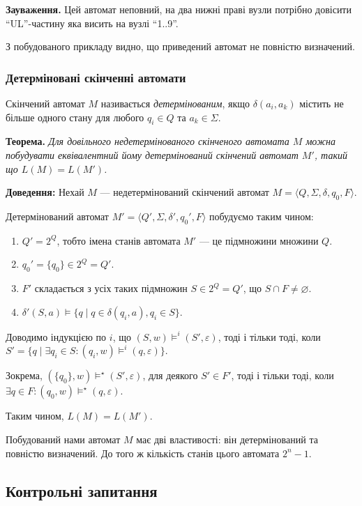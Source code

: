 \textbf{Зауваження.} Цей автомат неповний, на два нижні праві вузли потрібно довісити ``UL''-частину яка висить на вузлі ``1..9''. \medskip

З побудованого прикладу видно, що приведений автомат не повністю визначений.

\subsubsection{Детерміновані скінченні автомати}

Скінчений автомат $M$ називається \textit{детермінованим}, якщо $\delta(a_i, a_k)$ містить не більше одного стану для любого $q_i \in Q$ та $a_k \in \Sigma$. \medskip

\textbf{Теорема.} \textit{Для довільного недетермінованого скінченого автомата $M$ можна побудувати еквівалентний йому детермінований скінчений автомат $M'$, такий що $L(M) = L(M')$. }

\textbf{Доведення:} Нехай $M$ --- недетермінований скінчений автомат $M = \langle Q, \Sigma, \delta, q_0, F\rangle$. \medskip

Детермінований автомат $M' = \langle Q', \Sigma, \delta', q_0', F\rangle$ побудуємо таким чином:
\begin{enumerate}
	\item $Q' = 2^Q$, тобто імена станів автомата $M'$ --- це підмножини множини $Q$.
	\item $q_0' = \{q_0\} \in 2^Q = Q'$.
	\item $F'$ складається з усіх таких підмножин $S \in 2^Q = Q'$, що $S \cap F \ne \varnothing$.
	\item $\delta'(S, a) \models \{q \mid q \in \delta(q_i, a), q_i \in S\}$.
\end{enumerate}

Доводимо індукцією по $i$, що $(S, w) \models^i (S', \varepsilon)$, тоді і тільки тоді, коли $S' = \{q \mid \exists q_i \in S: (q_i, w) \models^i (q, \varepsilon)\}$. \medskip

Зокрема, $ (\{q_0\}, w) \models^\star (S', \varepsilon)$, для деякого $S' \in F'$, тоді і тільки тоді, коли $\exists q \in F: (q_0, w) \models^\star (q, \varepsilon)$. \medskip

Таким чином, $L(M) = L(M')$. \medskip

Побудований нами автомат $M$ має дві властивості: він детермінований та повністю визначений. До того ж кількість станів цього автомата $2^n - 1$.

\subsection{Контрольні запитання}

